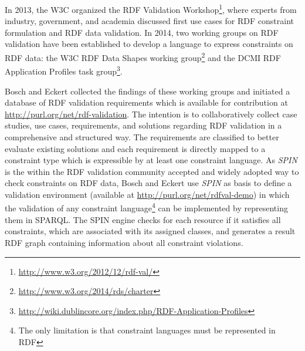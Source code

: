 \documentclass{llncs}
\begin{document}
In 2013, the W3C organized the RDF Validation Workshop\footnote{\url{http://www.w3.org/2012/12/rdf-val/}}, 
where experts from industry, government, and academia discussed first use cases for RDF constraint formulation and RDF data validation.
In 2014, two working groups on RDF validation have been established to develop a language to express constraints on RDF data: 
the W3C RDF Data Shapes working group\footnote{\url{http://www.w3.org/2014/rds/charter}} and the DCMI RDF Application Profiles task group\footnote{\url{http://wiki.dublincore.org/index.php/RDF-Application-Profiles}}. 

Bosch and Eckert \cite{BoschEckert2014} collected the findings of these working groups and initiated a database of RDF validation requirements
which is available for contribution at \url{http://purl.org/net/rdf-validation}.
The intention is to collaboratively collect case studies, use cases, requirements, and solutions regarding RDF validation in a comprehensive and structured way. 
The requirements are classified to better evaluate existing solutions and each requirement is directly mapped to a constraint type which is expressible by at least one constraint language.
As \emph{SPIN} is the within the RDF validation community accepted and widely adopted way to check constraints on RDF data, Bosch and Eckert \cite{BoschEckert2014-2} use \emph{SPIN} as basis to define a
validation environment (available at \url{http://purl.org/net/rdfval-demo}) in which the validation of any constraint language\footnote{The only limitation is that constraint languages must be represented in RDF} can be implemented by representing them in SPARQL. 
The SPIN engine checks for each resource if it satisfies all constraints, which are associated with its assigned classes, and generates a result RDF graph containing information about all constraint violations.

\end{document}

